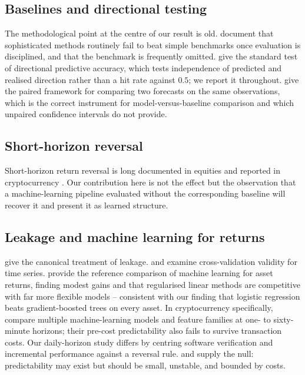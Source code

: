 \documentclass[preprint,12pt,authoryear]{elsarticle}
\begin{document}
\subsection{Baselines and directional testing}

The methodological point at the centre of our result is old.
\citet{makridakis2018statistical} document that sophisticated methods routinely
fail to beat simple benchmarks once evaluation is disciplined, and that the
benchmark is frequently omitted. \citet{pesaran1992simple} give the standard
test of directional predictive accuracy, which tests independence of predicted
and realised direction rather than a hit rate against $0.5$; we report it
throughout. \citet{diebold1995comparing} give the paired framework for comparing
two forecasts on the same observations, which is the correct instrument for
model-versus-baseline comparison and which unpaired confidence intervals do not
provide.

\subsection{Short-horizon reversal}

Short-horizon return reversal is long documented in equities
\citep{lo1990contrarian,jegadeesh1990evidence} and reported in cryptocurrency
\citep{caporale2019reverse}. Our contribution here is not the effect but the
observation that a machine-learning pipeline evaluated without the corresponding
baseline will recover it and present it as learned structure.

\subsection{Leakage and machine learning for returns}

\citet{kaufman2012leakage} give the canonical treatment of leakage.
\citet{bergmeir2012use} and \citet{cerqueira2020evaluating} examine
cross-validation validity for time series. \citet{gu2020empirical} provide the
reference comparison of machine learning for asset returns, finding modest gains
and that regularised linear methods are competitive with far more flexible
models -- consistent with our finding that logistic regression beats
gradient-boosted trees on every asset. In cryptocurrency specifically,
\citet{jaquart2021short} compare multiple machine-learning models and feature
families at one- to sixty-minute horizons; their pre-cost predictability also
fails to survive transaction costs. Our daily-horizon study differs by centring
software verification and incremental performance against a reversal rule.
\citet{fama1970efficient} and
\citet{timmermann2004efficient} supply the null: predictability may exist but
should be small, unstable, and bounded by costs.
\end{document}
